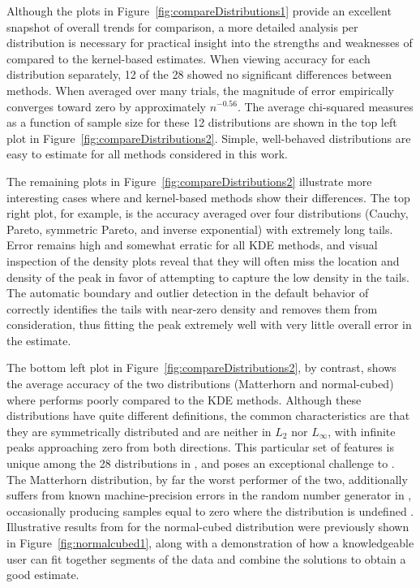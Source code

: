 Although the plots in Figure~\ref{fig:compareDistributions1} provide an excellent snapshot of overall trends for comparison, a more detailed analysis per distribution is necessary for practical insight into the strengths and weaknesses of  compared to the kernel-based estimates.  When viewing accuracy for each distribution separately, 12 of the 28 showed no significant differences between methods. When averaged over many trials, the magnitude of error empirically converges toward zero by approximately $n^{-0.56}$. The average chi-squared measures as a function of sample size for these 12 distributions are shown in the top left plot in Figure~\ref{fig:compareDistributions2}. Simple, well-behaved distributions are easy to estimate for all methods considered in this work.

The remaining plots in Figure~\ref{fig:compareDistributions2} illustrate more interesting cases where  and kernel-based methods show their differences.  The top right plot, for example, is the accuracy averaged over four distributions (Cauchy, Pareto, symmetric Pareto, and inverse exponential) with extremely long tails.  Error remains high and somewhat erratic for all KDE methods, and visual inspection of the density plots reveal that they will often miss the location and density of the peak in favor of attempting to capture the low density in the tails.  The automatic boundary and outlier detection in the default behavior of  correctly identifies the tails with near-zero density and removes them from consideration, thus fitting the peak extremely well with very little overall error in the estimate.

The bottom left plot in Figure~\ref{fig:compareDistributions2}, by contrast, shows the average accuracy of the two distributions (Matterhorn and normal-cubed) where  performs poorly compared to the KDE methods. Although these distributions have quite different definitions, the common characteristics are that they are symmetrically distributed and are neither in $L_2$ nor $L_\infty$, with infinite peaks approaching zero from both directions.  This particular set of features is unique among the 28 distributions in , and poses an exceptional challenge to . The Matterhorn distribution, by far the worst performer of the two, additionally suffers from known machine-precision errors in the random number generator in , occasionally producing samples equal to zero where the distribution is undefined \citep{benchden}. Illustrative results from  for the normal-cubed distribution were previously shown in Figure~\ref{fig:normalcubed1}, along with a demonstration of how a knowledgeable user can fit together segments of the data and combine the solutions to obtain a good estimate.

